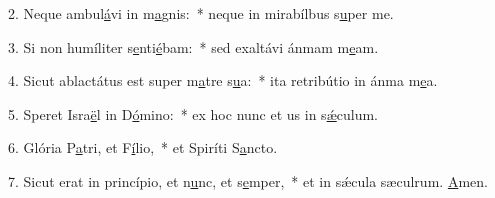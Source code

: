 2. Neque ambul\uline{á}vi in m\uline{a}gnis:~* neque in mirabílbus s\uline{u}per me.\par 
3. Si non humíliter s\uline{e}nti\uline{é}bam:~* sed exaltávi ánmam m\uline{e}am.\par 
4. Sicut ablactátus est super m\uline{a}tre s\uline{u}a:~* ita retribútio in ánma m\uline{e}a.\par 
5. Speret Isra\uline{ë}l in D\uline{ó}mino:~* ex hoc nunc et us in s\uline{ǽ}culum.\par 
6. Glória P\uline{a}tri, et F\uline{í}lio,~* et Spiríti S\uline{a}ncto.\par 
7. Sicut erat in princípio, et n\uline{u}nc, et s\uline{e}mper,~* et in sǽcula sæculrum. \uline{A}men.\par 
